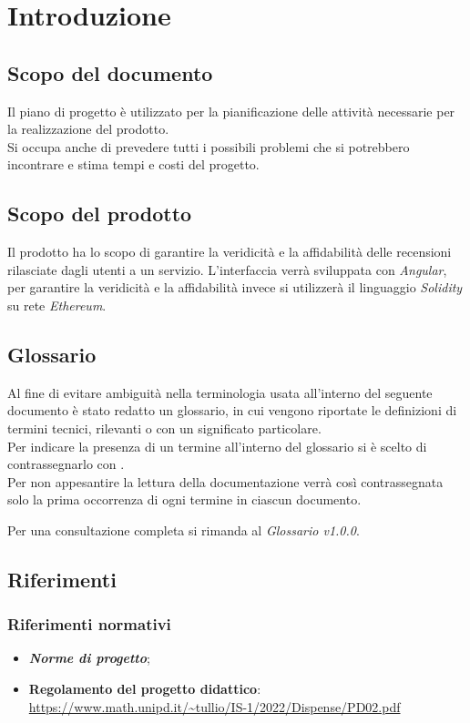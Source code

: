 \section{Introduzione}

\subsection{Scopo del documento}
Il piano di progetto è utilizzato per la pianificazione delle attività necessarie per la realizzazione del prodotto. \\
Si occupa anche di prevedere tutti i possibili problemi che si potrebbero incontrare e stima tempi e costi del progetto.

\subsection{Scopo del prodotto}
Il prodotto ha lo scopo di garantire la veridicità e la affidabilità 
delle recensioni rilasciate dagli utenti a un servizio. L'interfaccia verrà
sviluppata con \textit{Angular}, per garantire la veridicità e la affidabilità 
invece si utilizzerà il linguaggio \textit{Solidity} su rete \textit{Ethereum}.

\subsection{Glossario}
Al fine di evitare ambiguità nella terminologia usata all'interno del seguente
documento è stato redatto un glossario, in cui vengono riportate le definizioni
di termini tecnici, rilevanti o con un significato particolare. \\ Per indicare
la presenza di un termine all'interno del glossario si è scelto di
contrassegnarlo con \glo.\\ Per non appesantire la lettura della documentazione
verrà così contrassegnata solo la prima occorrenza di ogni termine in ciascun
documento.

Per una consultazione completa si rimanda al \textit{Glossario v1.0.0}.

\subsection{Riferimenti}
    \subsubsection{Riferimenti normativi}
    \begin{itemize}
        \item \textbf{\textit{Norme di progetto}};
        \item \textbf{Regolamento del progetto didattico}: \\
        \url{https://www.math.unipd.it/~tullio/IS-1/2022/Dispense/PD02.pdf}
    \end{itemize}
